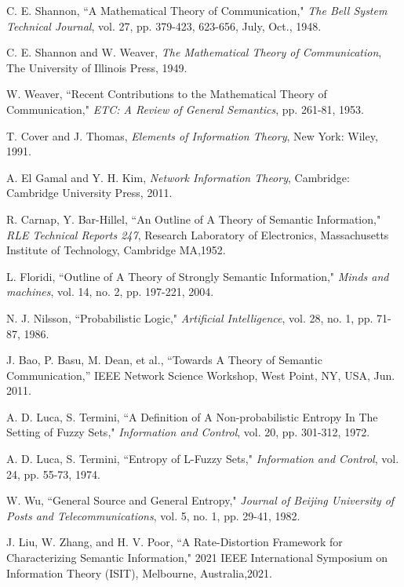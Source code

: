 \documentclass[12pt, draftclsnofoot,onecolumn]{IEEEtran}
\begin{document}
\begin{thebibliography}{99}

C. E. Shannon, ``A Mathematical Theory of Communication," \emph{The Bell System Technical Journal}, vol. 27, pp. 379-423, 623-656, July, Oct., 1948.

C. E. Shannon and W. Weaver, \emph{The Mathematical Theory of Communication}, The University of Illinois Press, 1949.

W. Weaver, ``Recent Contributions to the Mathematical Theory of Communication," \emph{ETC: A Review of General Semantics}, pp. 261-81, 1953.

T. Cover and J. Thomas, \emph{Elements of Information Theory}, New York: Wiley, 1991.

A. El Gamal and Y. H. Kim, \emph{Network Information Theory}, Cambridge: Cambridge University Press, 2011.

R. Carnap, Y. Bar-Hillel, ``An Outline of A Theory of Semantic Information," \emph{RLE Technical Reports 247}, Research Laboratory of Electronics, Massachusetts Institute of Technology, Cambridge MA,1952.

L. Floridi, ``Outline of A Theory of Strongly Semantic Information," \emph{Minds and machines}, vol. 14, no. 2, pp. 197-221, 2004.

N. J. Nilsson, ``Probabilistic Logic," \emph{Artificial Intelligence}, vol. 28, no. 1, pp. 71-87, 1986.

J. Bao, P. Basu, M. Dean, et al., ``Towards A Theory of Semantic Communication,'' IEEE Network Science Workshop, West Point, NY, USA, Jun. 2011.

A. D. Luca, S. Termini, ``A Definition of A Non-probabilistic Entropy In The Setting of Fuzzy Sets," \emph{Information and Control}, vol. 20, pp. 301-312, 1972.

A. D. Luca, S. Termini, ``Entropy of L-Fuzzy Sets," \emph{Information and Control}, vol. 24, pp. 55-73, 1974.

W. Wu, ``General Source and General Entropy," \emph{Journal of Beijing University of Posts and Telecommunications}, vol. 5, no. 1, pp. 29-41, 1982.

J. Liu, W. Zhang, and H. V. Poor, ``A Rate-Distortion Framework for Characterizing Semantic Information," 2021 IEEE International Symposium
on Information Theory (ISIT), Melbourne, Australia,2021.


\end{thebibliography}
\end{document}
